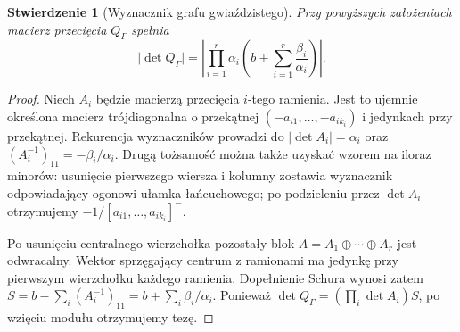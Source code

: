\documentclass[11pt,a4paper]{report}
\numberwithin{equation}{section}
\theoremstyle{plain}
\newtheorem{stwierdzenie}[twierdzenie]{Stwierdzenie}
\theoremstyle{definition}
\theoremstyle{remark}
\begin{document}
\begin{stwierdzenie}[Wyznacznik grafu gwiaździstego]
\label{prop:tg-star-determinant}
Przy powyższych założeniach macierz przecięcia
$Q_\Gamma$ spełnia
\[
\big|\det Q_\Gamma\big|=
\left|\prod_{i=1}^r\alpha_i
\left(b+\sum_{i=1}^r\frac{\beta_i}{\alpha_i}\right)\right|.
\]
\end{stwierdzenie}
\begin{proof}
Niech $A_i$ będzie macierzą przecięcia $i$-tego ramienia.
Jest to ujemnie określona macierz trójdiagonalna o
przekątnej $(-a_{i1},\ldots,-a_{ik_i})$ i jedynkach
przy przekątnej. Rekurencja wyznaczników prowadzi do
$|\det A_i|=\alpha_i$ oraz
$(A_i^{-1})_{11}=-\beta_i/\alpha_i$.
Drugą tożsamość można także uzyskać wzorem na iloraz
minorów: usunięcie pierwszego wiersza i kolumny
zostawia wyznacznik odpowiadający ogonowi ułamka
łańcuchowego; po podzieleniu przez $\det A_i$
otrzymujemy $-1/[a_{i1},\ldots,a_{ik_i}]^-$.

Po usunięciu centralnego wierzchołka pozostały blok
$A=A_1\oplus\cdots\oplus A_r$ jest odwracalny.
Wektor sprzęgający centrum z ramionami ma jedynkę
przy pierwszym wierzchołku każdego ramienia.
Dopełnienie Schura wynosi zatem
$S=b-\sum_i(A_i^{-1})_{11}=b+\sum_i\beta_i/\alpha_i$.
Ponieważ $\det Q_\Gamma=(\prod_i\det A_i)S$,
po wzięciu modułu otrzymujemy tezę.
\end{proof}
\end{document}
